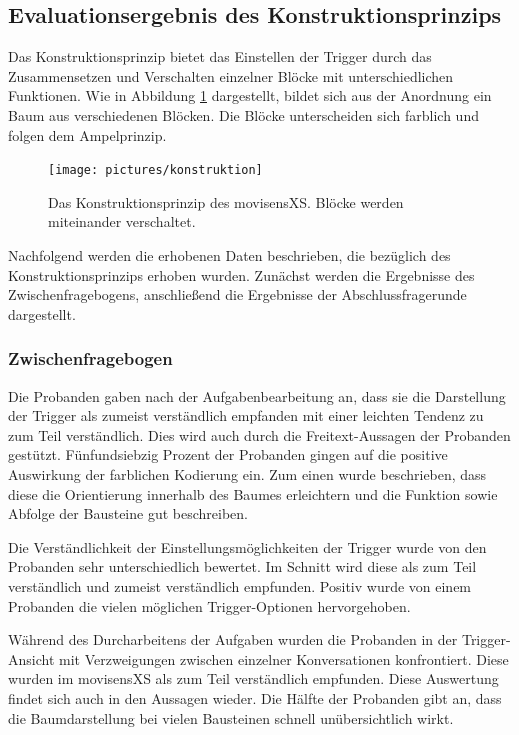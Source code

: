 
\subsection{Evaluationsergebnis des Konstruktionsprinzips}
Das Konstruktionsprinzip bietet das Einstellen der Trigger durch das Zusammensetzen und Verschalten einzelner Blöcke mit unterschiedlichen Funktionen. Wie in Abbildung \ref{konstruktion} dargestellt, bildet sich aus der Anordnung ein Baum aus verschiedenen Blöcken. Die Blöcke unterscheiden sich farblich und folgen dem Ampelprinzip.  

\begin{figure}[h]
\centering
\texttt{[image: pictures/konstruktion]}
\caption{Das Konstruktionsprinzip des movisensXS. Blöcke werden miteinander verschaltet.}
\label{konstruktion}
\end{figure}

Nachfolgend werden die erhobenen Daten beschrieben, die bezüglich des Konstruktionsprinzips erhoben wurden. Zunächst werden die Ergebnisse des Zwischenfragebogens, anschließend die Ergebnisse der Abschlussfragerunde dargestellt.

\subsubsection{Zwischenfragebogen}
Die Probanden gaben nach der Aufgabenbearbeitung an, dass sie die Darstellung der Trigger als zumeist verständlich empfanden mit einer leichten Tendenz zu zum Teil verständlich. Dies wird auch durch die Freitext-Aussagen der Probanden gestützt. Fünfundsiebzig Prozent der Probanden gingen auf die positive Auswirkung der farblichen Kodierung ein. Zum einen wurde beschrieben, dass diese die Orientierung innerhalb des Baumes erleichtern und die Funktion sowie Abfolge der Bausteine gut beschreiben.

Die Verständlichkeit der Einstellungsmöglichkeiten der Trigger wurde von den Probanden sehr unterschiedlich bewertet. Im Schnitt wird diese als zum Teil verständlich und zumeist verständlich empfunden. Positiv wurde von einem Probanden die vielen möglichen Trigger-Optionen hervorgehoben.

Während des Durcharbeitens der Aufgaben wurden die Probanden in der Trigger-Ansicht mit Verzweigungen zwischen einzelner Konversationen konfrontiert. Diese wurden im movisensXS als zum Teil verständlich empfunden. Diese Auswertung findet sich auch in den Aussagen wieder. Die Hälfte der Probanden gibt an, dass die Baumdarstellung bei vielen Bausteinen schnell unübersichtlich wirkt. 

